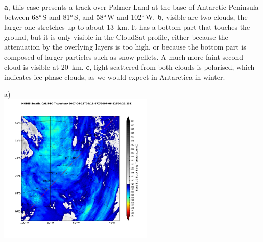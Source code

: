 \noindent
\begin{minipage}[t]{72mm}
\textbf{a}, this case presents a track over Palmer Land at the base of
Antarctic Peninsula between \ang{68}\,S and \ang{81}\,S, and \ang{58}\,W and \ang{102}\,W.
\textbf{b}, visible are two clouds, the larger one stretches up to
about \SI{13}{km}. It has a bottom part that touches the ground, but it is only
visible in the CloudSat profile, either because the
attenuation by the overlying layers is too high, or
because the bottom part is composed of larger particles
such as snow pellets. A much more faint second cloud is
visible at \SI{20}{km}.
\textbf{c}, light scattered from both clouds is polarised,
which indicates ice-phase clouds, as we would expect in
Antarctica in winter.
\end{minipage}\hfill
\begin{minipage}[t]{74mm}
\noindent\textsf{\small a)}\\
\includegraphics[width=74mm,clip,trim=10mm 10mm 4mm 4mm]{images/antarctica/orbit-modis_x31+calipso.pdf}
\end{minipage}

